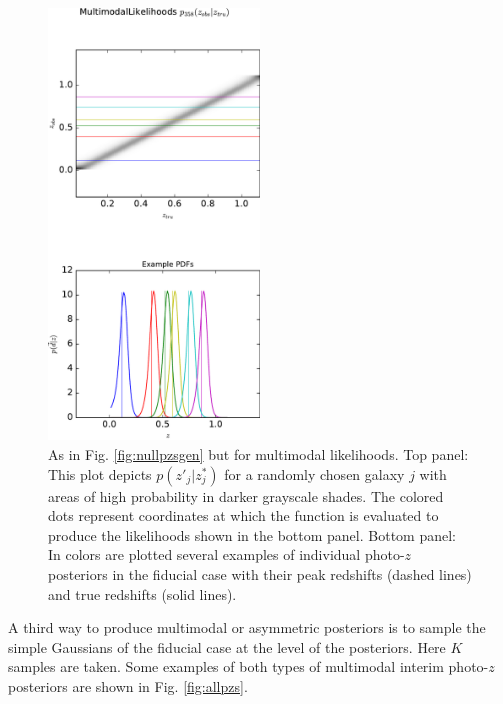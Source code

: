 \documentclass[preprint]{aastex}
\begin{document}
\begin{figure}
\includegraphics[width=0.5\textwidth]{figs/mult/zobsvztru.pdf}
\caption{As in Fig. \ref{fig:nullpzsgen} but for multimodal likelihoods.  Top 
panel: This plot depicts $p(z'_{j}|z^{*}_{j})$ for a randomly chosen galaxy $j$ 
with areas of high probability in darker grayscale shades.  The colored dots 
represent coordinates at which the function is evaluated to produce the 
likelihoods shown in the bottom panel.  Bottom panel: In colors are plotted 
several examples of individual photo-$z$ posteriors in the fiducial case with 
their peak redshifts (dashed lines) and true redshifts (solid lines).}
\label{fig:multpzsgen}
\end{figure}

A third way to produce multimodal or asymmetric posteriors is to sample the 
simple Gaussians of the fiducial case at the level of the posteriors.  Here $K$ 
samples are taken.  Some examples of both types of multimodal interim photo-$z$ 
posteriors are shown in Fig. \ref{fig:allpzs}.  
\end{document}
